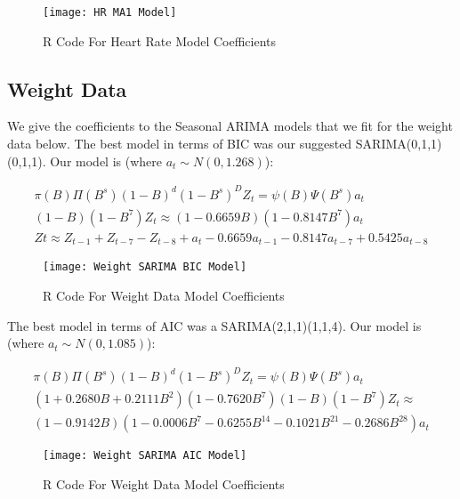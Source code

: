 \documentclass[12pt, letterpaper]{article}
\theoremstyle{definition}
\numberwithin{equation}{section}
\newcommand{\+}[1]{+_{\scalebox{.375}{#1}}}
\newcommand{\1}{\mathbbm{1}}
\begin{document}
\vspace{-0.5cm}
\begin{figure}[H]
	\centering
	\texttt{[image: HR MA1 Model]}
	\caption{R Code For Heart Rate Model Coefficients}
	\label{HR MA1}
\end{figure}




\newpage
\subsection{Weight Data}
\label{subsection.weight}

We give the coefficients to the Seasonal ARIMA models that we fit for the weight data below. The best model in terms of BIC was our suggested SARIMA(0,1,1)(0,1,1). Our model is (where $a_t \sim N(0, 1.268)$):

\vspace{-0.5cm}
\begin{align}
	\pi(B)\Pi(B^s)(1-B)^d(1-B^s)^DZ_t=\psi(B)\Psi(B^s)a_t\\
	(1-B)(1-B^7)Z_t\approx(1-0.6659B)(1-0.8147B^7)a_t\\
	Zt\approx Z_{t-1}+Z_{t-7}-Z_{t-8}+a_t-0.6659a_{t-1}-0.8147a_{t-7}+0.5425a_{t-8}
\end{align}

\vspace{-0.5cm}
\begin{figure}[H]
	\centering
	\texttt{[image: Weight SARIMA BIC Model]}
	\caption{R Code For Weight Data Model Coefficients}
	\label{Weight SARIMA BIC}
\end{figure}


The best model in terms of AIC was a SARIMA(2,1,1)(1,1,4). Our model is (where $a_t \sim N(0, 1.085)$):

\vspace{-0.5cm}
\begin{align}
	\pi(B)\Pi(B^s)(1-B)^d(1-B^s)^DZ_t=\psi(B)\Psi(B^s)a_t\\
	(1+0.2680B+0.2111B^2)(1-0.7620B^7)(1-B)(1-B^7)Z_t\approx\\(1 - 0.9142B)(1 - 0.0006B^7 - 0.6255B^{14} - 0.1021B^{21} - 0.2686B^{28})a_t
\end{align}

\vspace{-0.5cm}
\begin{figure}[H]
	\centering
	\texttt{[image: Weight SARIMA AIC Model]}
	\caption{R Code For Weight Data Model Coefficients}
	\label{Weight SARIMA AIC}
\end{figure}
\end{document}
